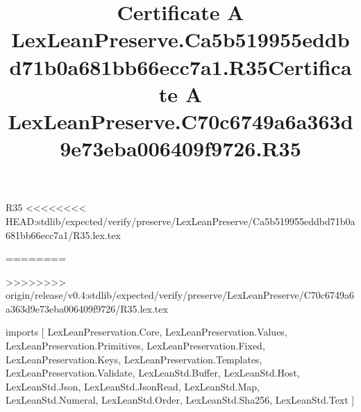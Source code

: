 \begin{lexlean}{R35}
<<<<<<<< HEAD:stdlib/expected/verify/preserve/LexLeanPreserve/Ca5b519955eddbd71b0a681bb66ecc7a1/R35.lex.tex
\title{Certificate A LexLeanPreserve.Ca5b519955eddbd71b0a681bb66ecc7a1.R35}
========
\title{Certificate A LexLeanPreserve.C70c6749a6a363d9e73eba006409f9726.R35}
>>>>>>>> origin/release/v0.4:stdlib/expected/verify/preserve/LexLeanPreserve/C70c6749a6a363d9e73eba006409f9726/R35.lex.tex
\begin{coremodule}
imports [
  LexLeanPreservation.Core,
  LexLeanPreservation.Values,
  LexLeanPreservation.Primitives,
  LexLeanPreservation.Fixed,
  LexLeanPreservation.Keys,
  LexLeanPreservation.Templates,
  LexLeanPreservation.Validate,
  LexLeanStd.Buffer,
  LexLeanStd.Host,
  LexLeanStd.Json,
  LexLeanStd.JsonRead,
  LexLeanStd.Map,
  LexLeanStd.Numeral,
  LexLeanStd.Order,
  LexLeanStd.Sha256,
  LexLeanStd.Text
]


\end{coremodule}
\end{lexlean}
